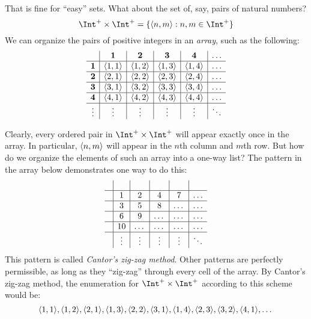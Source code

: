 \documentclass[../../../include/open-logic-section]{subfiles}
\begin{document}
\begin{explain}
That is fine for ``easy'' sets. What about the set of, say, pairs of
natural numbers?{}
\[
\Int^+ \times \Int^+ = \Setabs{\tuple{n,m}}{n,m \in \Int^+}
\]
We can organize the pairs of positive integers 
in an \emph{array}, such as the following:
\[
\begin{array}{ c | c | c | c | c | c}
& \textbf 1 & \textbf 2 & \textbf 3 & \textbf 4 & \dots \\
\hline
\textbf 1 & \tuple{1,1} & \tuple{1,2} & \tuple{1,3} & \tuple{1,4} & \dots \\
\hline
\textbf 2 & \tuple{2,1} & \tuple{2,2} & \tuple{2,3} & \tuple{2,4} & \dots \\
\hline
\textbf 3 & \tuple{3,1} & \tuple{3,2} & \tuple{3,3} & \tuple{3,4} & \dots \\
\hline
\textbf 4 & \tuple{4,1} & \tuple{4,2} & \tuple{4,3} & \tuple{4,4} & \dots \\
\hline
\vdots & \vdots & \vdots & \vdots & \vdots & \ddots\\
\end{array}
\]

Clearly, every ordered pair in $\Int^+ \times \Int^+$ will appear
exactly once in the array. In particular, $\langle n,m \rangle$ will appear in
the $n$th column and $m$th row. But how do we organize the elements of
such an array into a one-way list? The pattern in the array below
demonstrates one way to do this:
\[
\begin{array}{ c | c | c | c | c | c }
& & & & & \\
\hline
& 1 & 2 & 4 & 7 & \dots \\
\hline
& 3 & 5 & 8 & \dots & \dots \\
\hline
& 6 & 9 & \dots & \dots & \dots \\
\hline
& 10 & \dots & \dots & \dots & \dots \\
\hline
& \vdots & \vdots & \vdots & \vdots & \ddots\\
\end{array}
\]
This pattern is called \emph{Cantor's zig-zag method}. Other patterns
are perfectly permissible, as long as they ``zig-zag'' through every
cell of the array. By Cantor's zig-zag method, the enumeration for
$\Int^+ \times \Int^+$ according to this scheme would be:
\[
\langle 1,1 \rangle, \langle 1,2 \rangle, \langle 2,1 \rangle, \langle 1,3 \rangle, \langle 2,2 \rangle,
\langle 3,1 \rangle, \langle 1,4 \rangle, \langle 2,3 \rangle, \langle 3,2 \rangle, \langle 4,1 \rangle, \dots
\]


\end{explain}
\end{document}
